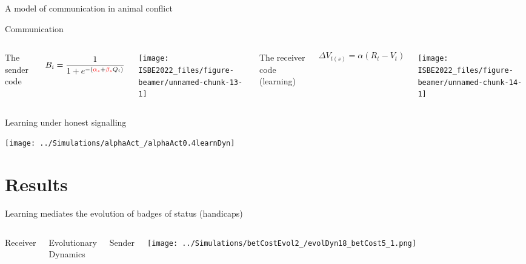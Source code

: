 \documentclass[
  ignorenonframetext,
  aspectratio=169]{beamer}
\begin{document}
\begin{frame}{A model of communication in animal conflict}
\begin{block}{Communication}
\begin{columns}[T]
The sender code

\tiny
\begin{equation*}
B_i = \frac{1}{1+e^{-(\textcolor{red}{\alpha_s} +\textcolor{red}{\beta_s} Q_i)}}
\end{equation*}



\begin{center}\texttt{[image: ISBE2022\_files/figure-beamer/unnamed-chunk-13-1]} \end{center}



The receiver code (learning)

\tiny
\begin{equation*}
  \Delta V_{t(s)}=\alpha (R_t-V_t)
\end{equation*}



\begin{center}\texttt{[image: ISBE2022\_files/figure-beamer/unnamed-chunk-14-1]} \end{center}

\end{columns}
\end{block}
\end{frame}

\begin{frame}{Learning under honest signalling}
\protect\hypertarget{learning-under-honest-signalling}{}
\begin{center}\texttt{[image: ../Simulations/alphaAct\_/alphaAct0.4learnDyn]} \end{center}
\end{frame}

\hypertarget{results}{%
\section{Results}\label{results}}

\begin{frame}{Learning mediates the evolution of badges of status
(handicaps)}
\protect\hypertarget{learning-mediates-the-evolution-of-badges-of-status-handicaps}{}
\begin{columns}[T]



\tiny
\vspace{1cm}

Receiver  

\vspace{2cm}

Evolutionary  \\
Dynamics

\vspace{2cm}

Sender


\texttt{[image: ../Simulations/betCostEvol2\_/evolDyn18\_betCost5\_1.png]}

\end{columns}
\end{frame}
\end{document}

